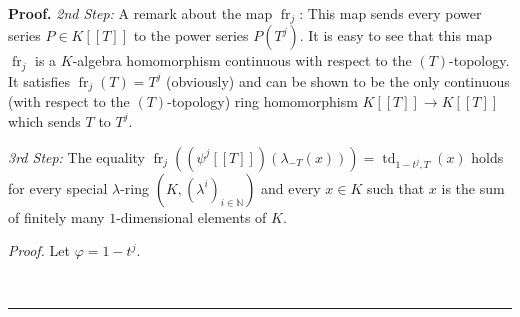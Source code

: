 \documentclass[numbers=enddot,12pt,final,onecolumn,notitlepage]{scrartcl}%
\newenvironment{proof}[1][Proof]{\noindent\textbf{#1.} }{\ \rule{0.5em}{0.5em}}
\begin{document}
\begin{proof}
\textit{2nd Step:} A remark about the map $\operatorname*{fr}\nolimits_{j}$:
This map sends every power series $P\in K\left[  \left[  T\right]  \right]  $
to the power series $P\left(  T^{j}\right)  $. It is easy to see that this map
$\operatorname*{fr}\nolimits_{j}$ is a $K$-algebra homomorphism continuous
with respect to the $\left(  T\right)  $-topology. It satisfies
$\operatorname*{fr}\nolimits_{j}\left(  T\right)  =T^{j}$ (obviously) and can
be shown to be the only continuous (with respect to the $\left(  T\right)
$-topology) ring homomorphism $K\left[  \left[  T\right]  \right]  \rightarrow
K\left[  \left[  T\right]  \right]  $ which sends $T$ to $T^{j}$.

\textit{3rd Step:} The equality $\operatorname*{fr}\nolimits_{j}\left(
\left(  \psi^{j}\left[  \left[  T\right]  \right]  \right)  \left(
\lambda_{-T}\left(  x\right)  \right)  \right)  =\operatorname*{td}%
\nolimits_{1-t^{j},T}\left(  x\right)  $ holds for every special $\lambda
$-ring $\left(  K,\left(  \lambda^{i}\right)  _{i\in\mathbb{N}}\right)  $ and
every $x\in K$ such that $x$ is the sum of finitely many $1$-dimensional
elements of $K$.

\textit{Proof.} Let $\varphi=1-t^{j}$.


\end{proof}
\end{document}
